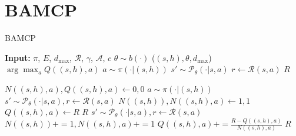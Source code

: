 \appendix
\section{BAMCP} \label{bamcp}

\begin{algorithm}[h]
  \caption{BAMCP}
  \label{alg:1}
  \begin{multicols}{2}
    \begin{algorithmic}
      \State
      \State \textbf{Input:} $\pi$, $E$, $d_{\text{max}}$, $\mathcal{R}$, $\gamma$, $\mathcal{A}$, $c$
      \State
        \State $\theta \sim b(\cdot)$
        \State {}($(s, h), \theta, d_{\text{max}}$)
        \EndFor
        \State \Return $\arg \max_{a} Q((s, h), a)$
      \EndProcedure
      \State
        \State {}
        \EndIf
        \State $a \sim \pi(\cdot|(s, h))$
        \State $s' \sim \mathcal{P}_\theta(\cdot|s, a)$
        \State $r \leftarrow \mathcal{R}(s, a)$
        \State \Return $R$
      \EndProcedure
    \end{algorithmic}
    \columnbreak
    \begin{algorithmic}
        \State {}
        \EndIf
        \State $N((s, h), a), Q((s, h), a) \leftarrow 0, 0$
        \EndFor
        \State $a \sim \pi(\cdot|(s, h))$
        \State $s' \sim \mathcal{P}_\theta(\cdot|s, a), r \leftarrow \mathcal{R}(s, a)$
        \State $N((s, h)), N((s, h), a) \leftarrow 1, 1$
        \State $Q((s, h), a) \leftarrow R$
        \State \Return $R$
        \EndIf
        \State $s' \sim \mathcal{P}_\theta(\cdot|s, a), r \leftarrow \mathcal{R}(s, a)$
        \State $N((s, h)) \mathrel{{+}{=}} 1, N((s, h), a) \mathrel{{+}{=}} 1$
        \State $Q((s, h), a) \mathrel{{+}{=}} \frac{R - Q((s, h), a)}{N((s, h), a)}$
        \State \Return $R$ 
      \EndProcedure
    \end{algorithmic}
  \end{multicols}
\end{algorithm}

